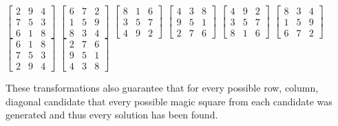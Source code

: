 \documentclass{article}
\begin{document}
    \begin{center}
        $\begin{bmatrix}
            2 & 9 & 4 \\
            7 & 5 & 3 \\
            6 & 1 & 8
        \end{bmatrix}$
        $\begin{bmatrix}
            6 & 7 & 2 \\
            1 & 5 & 9 \\
            8 & 3 & 4
        \end{bmatrix}$
        $\begin{bmatrix}
            8 & 1 & 6 \\
            3 & 5 & 7 \\
            4 & 9 & 2
        \end{bmatrix}$
        $\begin{bmatrix}
            4 & 3 & 8 \\
            9 & 5 & 1 \\
            2 & 7 & 6
        \end{bmatrix}$
        $\begin{bmatrix}
            4 & 9 & 2 \\
            3 & 5 & 7 \\
            8 & 1 & 6
        \end{bmatrix}$
        $\begin{bmatrix}
            8 & 3 & 4 \\
            1 & 5 & 9 \\
            6 & 7 & 2
        \end{bmatrix}$
        $\begin{bmatrix}
            6 & 1 & 8 \\
            7 & 5 & 3 \\
            2 & 9 & 4
        \end{bmatrix}$
        $\begin{bmatrix}
            2 & 7 & 6 \\
            9 & 5 & 1 \\
            4 & 3 & 8
        \end{bmatrix}$
    \end{center}
    These transformations also guarantee that for every possible row, column, diagonal candidate that every possible magic square from each candidate was generated and thus every solution has been found. 
    
\end{document}
